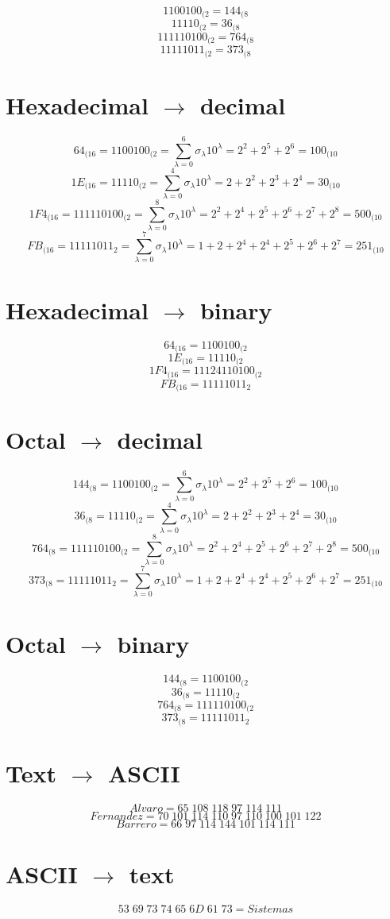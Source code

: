 \documentclass[12pt]{article}
\begin{document}
\[
	1100100_{(2} = 144_{(8}
\]
\[
	11110_{(2} = 36_{(8}
\]
\[
	111110100_{(2} = 764_{(8}
\]
\[
	11111011_{(2} = 373_{(8}
\]


\section{Hexadecimal \(\to\) decimal}

\[
    64_{(16} = 1100100_{(2} = \sum_{\lambda=0}^{6}\sigma_{\lambda}10^{\lambda} = 2^2 + 2^5 + 2^6 = 100_{(10}
\]
\[
    1E_{(16} = 11110_{(2} = \sum_{\lambda=0}^{4}\sigma_{\lambda}10^{\lambda} = 2 + 2^2 + 2^3 + 2^4 = 30_{(10}
\]
\[
    1F4_{(16} = 111110100_{(2} = \sum_{\lambda=0}^{8}\sigma_{\lambda}10^{\lambda} = 2^2 + 2^4 + 2^5 + 2^6 + 2^7 + 2^8 = 500_{(10}
\]
\[
    FB_{(16} = 11111011_{2} = \sum_{\lambda=0}^{7}\sigma_{\lambda}10^{\lambda} = 1 + 2 + 2^4 + 2^4 + 2^5 + 2^6 + 2^7 = 251_{(10}
\]

\section{Hexadecimal \(\to\) binary}

\[
    64_{(16} = 1100100_{(2}
\]
\[
    1E_{(16} = 11110_{(2}
\]
\[
    1F4_{(16} = 11124110100_{(2}
\]
\[
    FB_{(16} = 11111011_{2}
\]

\section{Octal \(\to\) decimal}

\[
    144_{(8} = 1100100_{(2} = \sum_{\lambda=0}^{6}\sigma_{\lambda}10^{\lambda} = 2^2 + 2^5 + 2^6 = 100_{(10}
\]
\[
    36_{(8} = 11110_{(2} = \sum_{\lambda=0}^{4}\sigma_{\lambda}10^{\lambda} = 2 + 2^2 + 2^3 + 2^4 = 30_{(10}
\]
\[
    764_{(8} = 111110100_{(2} = \sum_{\lambda=0}^{8}\sigma_{\lambda}10^{\lambda} = 2^2 + 2^4 + 2^5 + 2^6 + 2^7 + 2^8 = 500_{(10}
\]
\[
    373_{(8} = 11111011_{2} = \sum_{\lambda=0}^{7}\sigma_{\lambda}10^{\lambda} = 1 + 2 + 2^4 + 2^4 + 2^5 + 2^6 + 2^7 = 251_{(10}
\]

\section{Octal \(\to\) binary}

\[
    144_{(8} = 1100100_{(2}
\]
\[
    36_{(8} = 11110_{(2}
\]
\[
    764_{(8} = 111110100_{(2}
\]
\[
    373_{(8} = 11111011_{2}
\]

\section{Text \(\to\) ASCII}

\[
    Alvaro = 65\;108\;118\;97\;114\;111
\]
\[
    Fernandez = 70\;101\;114\;110\;97\;110\;100\;101\;122
\]
\[
    Barrero = 66\;97\;114\;144\;101\;114\;111
\]

\section{ASCII \(\to\) text}

\[
    53\;69\;73\;74\;65\;6D\;61\;73 = Sistemas
\]
\end{document}
